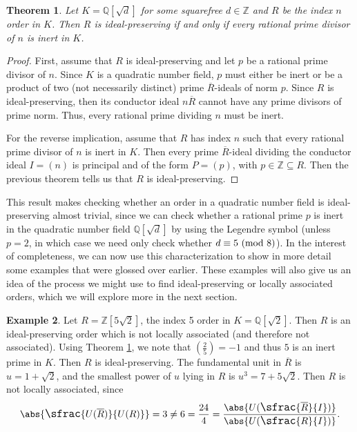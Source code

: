 \documentclass[12pt]{amsart}
\newtheorem{theorem}{Theorem}[section]
\theoremstyle{definition}
\newtheorem{example}[theorem]{Example}
\newcommand{\kron}[2]{\left(\frac{#1}{#2}\right)}
\newcommand{\bZ}{\mathbb Z}
\newcommand{\bQ}{\mathbb Q}
\newcommand{\Rbar}{\overline{R}}
\newcommand{\modulo}[1]{\textup{ (mod }#1)}
\newcommand{\quot}[2]{\large\sfrac{#1}{#2}\normalsize}
\begin{document}
	\begin{theorem}
		\label{ip iff inert primes}
		Let $K=\bQ[\sqrt{d}]$ for some squarefree $d\in\bZ$ and $R$ be the index $n$ order in $K$. Then $R$ is ideal-preserving if and only if every rational prime divisor of $n$ is inert in $K$. 
	\end{theorem}
	
	\begin{proof}
		First, assume that $R$ is ideal-preserving and let $p$ be a rational prime divisor of $n$. Since $K$ is a quadratic number field, $p$ must either be inert or be a product of two (not necessarily distinct) prime $\Rbar$-ideals of norm $p$. Since $R$ is ideal-preserving, then its conductor ideal $n\Rbar$ cannot have any prime divisors of prime norm. Thus, every rational prime dividing $n$ must be inert.
		
		For the reverse implication, assume that $R$ has index $n$ such that every rational prime divisor of $n$ is inert in $K$. Then every prime $\Rbar$-ideal dividing the conductor ideal $I=(n)$ is principal and of the form $P=(p)$, with $p\in\bZ\subseteq R$. Then the previous theorem tells us that $R$ is ideal-preserving.
	\end{proof}
	
	This result makes checking whether an order in a quadratic number field is ideal-preserving almost trivial, since we can check whether a rational prime $p$ is inert in the quadratic number field $\bQ[\sqrt{d}]$ by using the Legendre symbol (unless $p=2$, in which case we need only check whether $d\equiv 5\modulo{8}$). In the interest of completeness, we can now use this characterization to show in more detail some examples that were glossed over earlier. These examples will also give us an idea of the process we might use to find ideal-preserving or locally associated orders, which we will explore more in the next section.
	
	\begin{example}
		\label{ip not la}
		Let $R=\bZ[5\sqrt{2}]$, the index 5 order in $K=\bQ[\sqrt{2}]$. Then $R$ is an ideal-preserving order which is not locally associated (and therefore not associated). Using Theorem \ref{ip iff inert primes}, we note that $\kron{2}{5}=-1$ and thus $5$ is an inert prime in $K$. Then $R$ is ideal-preserving. The fundamental unit in $\Rbar$ is $u=1+\sqrt{2}$, and the smallest power of $u$ lying in $R$ is $u^3=7+5\sqrt{2}$. Then $R$ is not locally associated, since
		$$\abs{\quot{U(\Rbar)}{U(R)}}=3\neq 6=\frac{24}{4}=\frac{\abs{U(\quot{\Rbar}{I})}}{\abs{U(\quot{R}{I})}}.$$
	\end{example}
	
\end{document}
